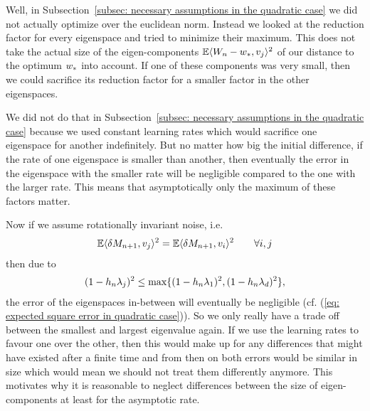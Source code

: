 Well, in Subsection~\ref{subsec: necessary assumptions in the quadratic case}
we did not actually optimize over the euclidean norm. Instead we looked at the
reduction factor for every eigenspace and tried to minimize their maximum.
This does not take the actual size of the eigen-components
\(\mathbb{E}\langle W_n-w_*, v_j\rangle^2\) of our distance to the optimum
\(w_*\) into account. If one of these components was very small, then
we could sacrifice its reduction factor for a smaller factor in the other
eigenspaces.

We did not do that in Subsection~\ref{subsec: necessary assumptions
in the quadratic case} because we used constant learning rates which would
sacrifice one eigenspace for another indefinitely. But no matter how big the
initial difference, if the rate of one eigenspace is smaller than another, then
eventually the error in the eigenspace with the smaller rate will be
negligible compared to the one with the larger rate. This means that
asymptotically only the maximum of these factors matter.

Now if we assume rotationally invariant noise, i.e.
\begin{align*}
	\mathbb{E}\langle\delta M_{n+1},v_j\rangle^2 = \mathbb{E}\langle\delta M_{n+1}, v_i\rangle^2
	\qquad \forall i,j
\end{align*}
then due to
\begin{align*}
	(1-h_n \lambda_j)^2
	\le \max \{ (1-h_n\lambda_1)^2, (1-h_n\lambda_d)^2 \},
\end{align*}
the error of the eigenspaces in-between will eventually be negligible (cf.
(\ref{eq: expected square error in quadratic case})). So we only really have a
trade off between the smallest and largest eigenvalue again.
If we use the learning rates to favour one over the other, then this would
make up for any differences that might have existed after a finite time and
from then on both errors would be similar in size which would mean we should
not treat them differently anymore. This motivates why it is reasonable to
neglect differences between the size of eigen-components at least for the
asymptotic rate.

